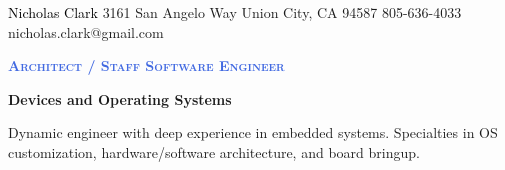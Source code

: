 \documentclass[letterpaper, 10pt]{article}
\newcommand{\NrcColorName}{Black}
\newcommand{\NrcColorTitle}{RoyalBlue}
\begin{document}
%
\nrctitle
{\textcolor{\NrcColorName}{Nicholas Clark}}
{3161 San Angelo Way}
{Union City, CA 94587}
{805-636-4033}
{nicholas.clark@gmail.com}
%
\begin{center}\par\smallskip
\textcolor{\NrcColorTitle}{\Large \textbf{\textsc{Architect / Staff Software Engineer}}}\par
\large \textbf{{Devices and Operating Systems}}\par
\smallskip
\noindent \begin{minipage}[t]{0.75\textwidth}%
\begin{center}
Dynamic engineer with deep experience in embedded systems. Specialties in
OS customization, hardware/software architecture, and board bringup.
\end{center}
\end{minipage}
\end{center}
\par \smallskip \smallskip
%
%
\end{document}
